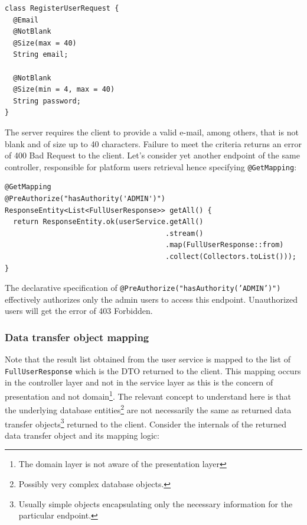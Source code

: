 \documentclass[a4paper,twoside,12pt]{book}
\begin{document}
\begin{verbatim}
class RegisterUserRequest {
  @Email
  @NotBlank
  @Size(max = 40)
  String email;

  @NotBlank
  @Size(min = 4, max = 40)
  String password;
}
\end{verbatim}

The server requires the client to provide a valid e-mail, among others, that is not blank and of size up to 40 characters. Failure to meet the criteria returns an error of 400 Bad Request to the client.
%
Let's consider yet another endpoint of the same controller, responsible for platform users retrieval hence specifying \verb|@GetMapping|:

\begin{verbatim}
@GetMapping
@PreAuthorize("hasAuthority('ADMIN')")
ResponseEntity<List<FullUserResponse>> getAll() {
  return ResponseEntity.ok(userService.getAll()
                                      .stream()
                                      .map(FullUserResponse::from)
                                      .collect(Collectors.toList()));
}
\end{verbatim}

The declarative specification of \texttt{@PreAuthorize("hasAuthority('ADMIN')")} effectively authorizes only the admin users to access this endpoint. Unauthorized users will get the error of 403 Forbidden.

\subsubsection{Data transfer object mapping}

Note that the result list obtained from the user service is mapped to the list of \texttt{FullUserResponse} which is the DTO returned to the client. This mapping occurs in the controller layer and not in the service layer as this is the concern of presentation and not domain\footnote{The domain layer is not aware of the presentation layer}.
%
The relevant concept to understand here is that the underlying database entities\footnote{Possibly very complex database objects.} are not necessarily the same as returned data transfer objects\footnote{Usually simple objects encapsulating only the necessary information for the particular endpoint.} returned to the client.
%
Consider the internals of the returned data transfer object and its mapping logic:
\end{document}
